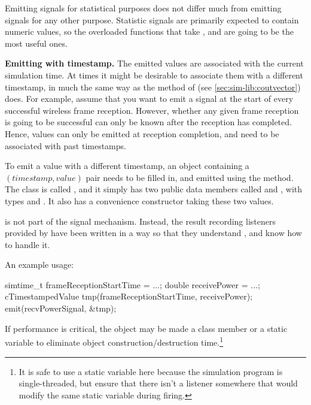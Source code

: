 Emitting signals for statistical purposes does not differ much from
emitting signals for any other purpose. Statistic signals are primarily
expected to contain numeric values, so the overloaded  functions
that take ,  and  are going to be the
most useful ones.

\textbf{Emitting with timestamp.} The emitted values are associated with
the current simulation time. At times it might be desirable to associate
them with a different timestamp, in much the same way as the
 method of  (see
\ref{sec:sim-lib:coutvector}) does. For example, assume that you want to
emit a signal at the start of every successful wireless frame reception.
However, whether any given frame reception is going to be successful can
only be known after the reception has completed. Hence, values can only be
emitted at reception completion, and need to be associated with past
timestamps.

To emit a value with a different timestamp, an object containing
a $(timestamp, value)$ pair needs to be filled in, and emitted using
the  method. The class is called
, and it simply has two public data members called
 and , with types  and .
It also has a convenience constructor taking these two values.

\begin{note}
 is not part of the signal mechanism. Instead,
the result recording listeners provided by {\opp} have been written
in a way so that they understand , and know how
to handle it.
\end{note}

An example usage:

\begin{cpp}
simtime_t frameReceptionStartTime = ...;
double receivePower = ...;
cTimestampedValue tmp(frameReceptionStartTime, receivePower);
emit(recvPowerSignal, &tmp);
\end{cpp}

If performance is critical, the  object may be
made a class member or a static variable to eliminate object
construction/destruction time.\footnote{It is safe to use a static
variable here because the simulation program is single-threaded,
but ensure that there isn't a listener somewhere that would modify
the same static variable during firing.}

